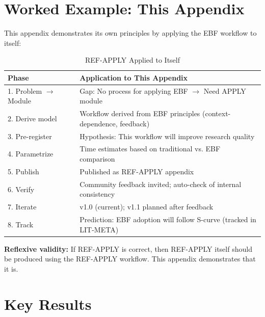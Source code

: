 
\section{Worked Example: This Appendix}
\label{sec:apply-example}

This appendix demonstrates its own principles by applying the EBF workflow
to itself:

\begin{table}[htbp]
\centering
\caption{REF-APPLY Applied to Itself}
\label{tab:self-application}
\renewcommand{\arraystretch}{1.3}
\small
\begin{tabular}{@{}lp{8cm}@{}}
\toprule
\textbf{Phase} & \textbf{Application to This Appendix} \\
\midrule
1. Problem $\to$ Module & Gap: No process for applying EBF $\to$ Need APPLY module \\
2. Derive model & Workflow derived from EBF principles (context-dependence, feedback) \\
3. Pre-register & Hypothesis: This workflow will improve research quality \\
4. Parametrize & Time estimates based on traditional vs. EBF comparison \\
5. Publish & Published as REF-APPLY appendix \\
6. Verify & Community feedback invited; auto-check of internal consistency \\
7. Iterate & v1.0 (current); v1.1 planned after feedback \\
8. Track & Prediction: EBF adoption will follow S-curve (tracked in LIT-META) \\
\bottomrule
\end{tabular}
\end{table}

\textbf{Reflexive validity:} If REF-APPLY is correct, then REF-APPLY itself
should be produced using the REF-APPLY workflow. This appendix demonstrates
that it is.




\section{Key Results}
\label{sec:apl-results}

